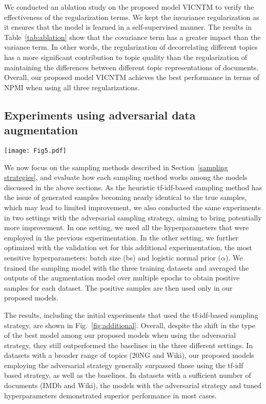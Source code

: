 \documentclass{article}
\begin{document}
We conducted an ablation study on the proposed model VICNTM to verify the effectiveness of the regularization terms. 
We kept the invariance regularization as it ensures that the model is learned in a self-supervised manner. 
The results in Table~\ref{tab:ablation} show that the covariance term has a greater impact than the variance term. 
In other words, the regularization of decorrelating different topics has a more significant contribution to topic quality than the regularization of maintaining the differences between different topic representations of documents. 
Overall, our proposed model VICNTM achieves the best performance in terms of NPMI when using all three regularizations.

\subsection{Experiments using adversarial data augmentation}\label{sec46}
\begin{figure*}[ht]
    \centering
    \texttt{[image: Fig5.pdf]}
    \caption{{\bf Results of NPMI when using different sampling strategies in our proposed models}} \label{fig:additional}
\end{figure*}

We now focus on the sampling methods described in Section~\ref{sampling strategies}, and evaluate how each sampling method works among the models discussed in the above sections.
As the heuristic tf-idf-based sampling method has the issue of generated samples becoming nearly identical to the true samples, which may lead to limited improvement, we also conducted the same experiments in two settings with the adversarial sampling strategy, aiming to bring potentially more improvement. 
In one setting, we used all the hyperparameters that were employed in the previous experimentation. In the other setting, we further optimized with the validation set for this additional experimentation, the most sensitive hyperparameters: batch size (bs) and logistic normal prior ($\alpha$).
We trained the sampling model with the three training datasets and averaged the outputs of the augmentation model over multiple epochs to obtain positive samples for each dataset. 
The positive samples are then used only in our proposed models. 

The results, including the initial experiments that used the tf-idf-based sampling strategy, are shown in Fig.~\ref{fig:additional}. 
Overall, despite the shift in the type of the best model among our proposed models when using the adversarial strategy, they still outperformed the baselines in the three different settings. 
In datasets with a broader range of topics (20NG and Wiki), our proposed models employing the adversarial strategy generally surpassed those using the tf-idf based strategy, as well as the baselines. 
In datasets with a sufficient number of documents (IMDb and Wiki), the models with the adversarial strategy and tuned hyperparameters demonstrated superior performance in most cases.
\end{document}
